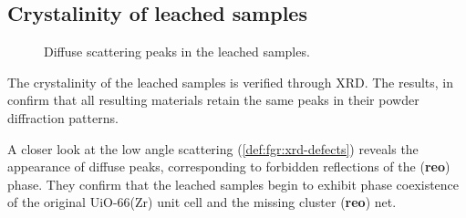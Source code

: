 
\subsection{Crystalinity of leached samples}\label{def:xrd}

\begin{wrapfigure}{r}{0.32\textwidth}
    \centering
    \captionsetup{format=plain}
    \caption{Diffuse scattering peaks in the  leached 
    samples.}%
    \label{def:fgr:xrd-defects}
\end{wrapfigure}

The crystalinity of the leached samples is verified through 
XRD. The results, in  confirm that all resulting materials
retain the same peaks in their powder diffraction patterns.

A closer look at the low angle scattering (\autoref{def:fgr:xrd-defects})
reveals the appearance of diffuse peaks, corresponding to forbidden
reflections of the (\textbf{reo}) phase. They confirm that the 
leached samples begin to exhibit phase coexistence of 
the original UiO-66(Zr) unit cell and the missing cluster
(\textbf{reo}) net. 